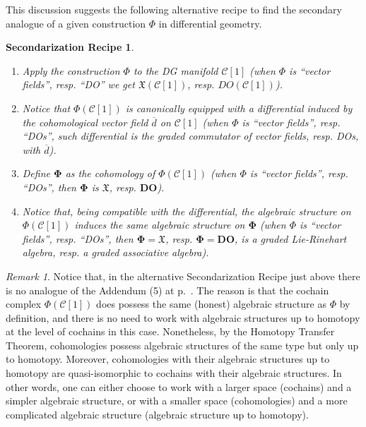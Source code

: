 \documentclass{conm-p-l}
\newtheorem*{recipe}{Secondarization Recipe}
\theoremstyle{definition}
\theoremstyle{remark}
\newtheorem{remark}[theorem]{Remark}
\numberwithin{equation}{section}
\begin{document}
This discussion suggests the following alternative recipe to find the secondary analogue of a given construction $\Phi$ in differential geometry.

\begin{recipe}\quad
\begin{enumerate}
\item Apply the construction $\Phi$ to the DG manifold $\mathscr C[1]$ (when $\Phi$ is ``vector fields'', resp.{} ``DO'' we get $\mathfrak X (\mathscr C[1])$, resp.{} $DO (\mathscr C[1])$).
\item Notice that $\Phi (\mathscr C[1])$ is canonically equipped with a differential induced by the cohomological vector field $\overline d$ on $\mathscr C[1]$ (when $\Phi$ is ``vector fields'', resp.{} ``DOs'', such differential is the graded commutator of vector fields, resp.{} DOs, with $\overline d$).
\item Define $\boldsymbol{\Phi}$ as the cohomology of $\Phi (\mathscr C[1])$ (when $\Phi$ is ``vector fields'', resp. ``DOs'', then $\boldsymbol \Phi$ is $\boldsymbol{\mathfrak X}$, resp.{} $\boldsymbol{DO}$).
\item Notice that, being compatible with the differential, the algebraic structure on $\Phi (\mathscr C[1])$ induces the same algebraic structure on $\boldsymbol{\Phi}$ (when $\Phi$ is ``vector fields'', resp.{} ``DOs'', then $\boldsymbol \Phi = \boldsymbol{\mathfrak X}$, resp.{} $\boldsymbol \Phi = \boldsymbol{DO}$, is a graded Lie-Rinehart algebra, resp.{} a graded associative algebra).
\end{enumerate}
\end{recipe}

 
\begin{remark}
Notice that, in the alternative Secondarization Recipe just above there is no analogue of the Addendum (5) at p.~\pageref{addendum}. The reason is that the cochain complex $\Phi (\mathscr C[1])$ does possess the same (honest) algebraic structure as $\Phi$ by definition, and there is no need to work with algebraic structures up to homotopy at the level of cochains in this case. Nonetheless, by the Homotopy Transfer Theorem, cohomologies possess algebraic structures of the same type but only up to homotopy. Moreover, cohomologies with their algebraic structures up to homotopy are quasi-isomorphic to cochains with their algebraic structures. In other words, one can either choose to work with a larger space (cochains) and a simpler algebraic structure, or with a smaller space (cohomologies) and a more complicated algebraic structure (algebraic structure up to homotopy).
\end{remark}
  
\end{document}
